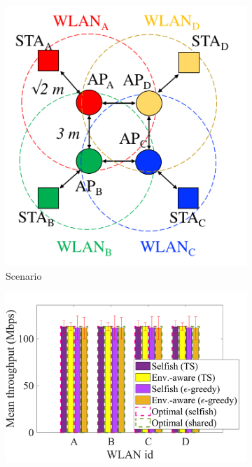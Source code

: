 \documentclass{article}
\begin{document}
\begin{figure}[h!]
	\centering
	\begin{subfigure}[b]{0.26\textwidth}
		\includegraphics[width=\textwidth]{s5_new}
		\caption{Scenario}
		\label{fig:selfish_s1}
	\end{subfigure}
	\begin{subfigure}[b]{0.36\textwidth}
		\includegraphics[width=\textwidth]{fig_2_2_potential}

\end{subfigure}
\end{figure}
\end{document}
